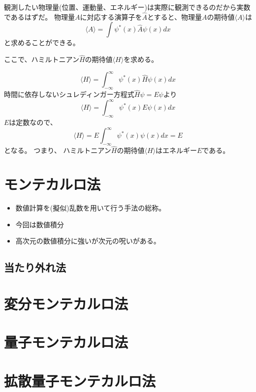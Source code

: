 \documentclass[dvipdfmx]{beamer}
\begin{document}
    \begin{frame}
        観測したい物理量(位置、運動量、エネルギー)は実際に観測できるのだから実数であるはずだ。
        物理量$A$に対応する演算子を$\hat{A}$とすると、物理量$A$の期待値$\langle A \rangle$は
        \begin{equation}
            \langle A \rangle = \int \psi^*(x) \hat{A} \psi(x) dx
        \end{equation}
        と求めることができる。
    \end{frame}

    \begin{frame}
        ここで、ハミルトニアン$\hat{H}$の期待値$\langle H \rangle$を求める。

        \begin{equation}
            \langle H \rangle = \int_{-\infty}^\infty \psi^*(x) \hat{H} \psi(x) dx
        \end{equation}
        時間に依存しないシュレディンガー方程式$\hat{H}\psi = E\psi$より
        \begin{equation}
            \langle H \rangle = \int_{-\infty}^\infty \psi^*(x) E \psi(x) dx
        \end{equation}
        $E$は定数なので、
        \begin{equation}
            \langle H \rangle = E\int_{-\infty}^\infty \psi^*(x)\psi(x) dx = E
        \end{equation}
        となる。
        つまり、
        \alert{ハミルトニアン$\hat{H}$の期待値$\langle H \rangle$はエネルギー$E$}である。
    \end{frame}

    \section{モンテカルロ法}
    \begin{frame}
        \begin{itemize}
            \item 数値計算を(擬似)乱数を用いて行う手法の総称。
            \item 今回は数値積分
            \item 高次元の数値積分に強いが次元の呪いがある。
        \end{itemize}
    \end{frame}

    \subsection{当たり外れ法}



    \section{変分モンテカルロ法}

    \section{量子モンテカルロ法}

    \section{拡散量子モンテカルロ法}



\end{document}
